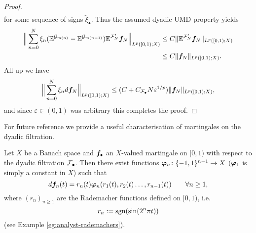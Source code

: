 \begin{proof}
\begin{equation*}
\begin{aligned}
    \end{aligned}
  \end{equation*}
  for some sequence of signs $\tilde{\xi}_{\bullet}$.
  Thus the assumed dyadic UMD property yields
  \begin{equation*}
    \begin{aligned}
      \Big\| \sum_{n=0}^{N} \xi_{n} (\mathbb{E}^{\mathcal{G}_{m(n)}} - \mathbb{E}^{\mathcal{G}_{m(n-1)}}) \mathbb{E}^{\mathcal{F}'_{N}} \bm{f}_{N} \Big\|_{L^p([0,1);X)}
      &\leq C \|\mathbb{E}^{\mathcal{F}'_{N}} \bm{f}_{N}\|_{L^p([0,1);X)} \\
      &\leq C\|\bm{f}_{N}\|_{L^p([0,1);X)}.
    \end{aligned}
    \end{equation*}
    All up we have
    \begin{equation*}
      \Big\| \sum_{n=0}^{N} \xi_{n} d\bm{f}_{N} \Big\|_{L^p([0,1);X)} \leq (C + C_{\mathcal{F}_{\bullet}} N \varepsilon^{1/p})\|\bm{f}_{N}\|_{L^p([0,1);X)},
    \end{equation*}
    and since $\varepsilon \in (0,1)$ was arbitrary this completes the proof.
  \end{proof}

  For future reference we provide a useful characterisation of martingales on the dyadic filtration.

  \begin{prop}\label{prop:PW-martingales}
    Let $X$ be a Banach space and $\bm{f}_{\bullet}$ an $X$-valued martingale on $[0,1)$ with respect to the dyadic filtration $\mathcal{F}_{\bullet}$.
    Then there exist functions $\bm{\varphi}_{n} \colon \{-1,1\}^{n-1} \to X$ ($\bm{\varphi}_{1}$ is simply a constant in $X$) such that
    \begin{equation*}
      d\bm{f}_{n}(t) = r_{n}(t) \bm{\varphi}_{n}(r_1(t), r_{2}(t)\ldots, r_{n-1}(t)) \qquad \forall n \geq 1,
    \end{equation*}
    where $(r_{n})_{n \geq 1}$ are the Rademacher functions defined on $[0,1)$, i.e.
    \begin{equation*}
      r_{n} := \operatorname{sgn}(\sin(2^n \pi t))
    \end{equation*}
    (see Example \ref{eg:analyst-rademachers}).
  \end{prop}

